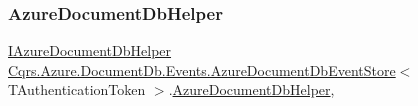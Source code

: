 \subsubsection{\texorpdfstring{Azure\+Document\+Db\+Helper}{AzureDocumentDbHelper}}
{\footnotesize\ttfamily \hyperlink{interfaceCqrs_1_1Azure_1_1DocumentDb_1_1IAzureDocumentDbHelper}{I\+Azure\+Document\+Db\+Helper} \hyperlink{classCqrs_1_1Azure_1_1DocumentDb_1_1Events_1_1AzureDocumentDbEventStore}{Cqrs.\+Azure.\+Document\+Db.\+Events.\+Azure\+Document\+Db\+Event\+Store}$<$ T\+Authentication\+Token $>$.\hyperlink{classCqrs_1_1Azure_1_1DocumentDb_1_1AzureDocumentDbHelper}{Azure\+Document\+Db\+Helper}\hspace{0.3cm}{\ttfamily [get]}, {\ttfamily [protected]}}

